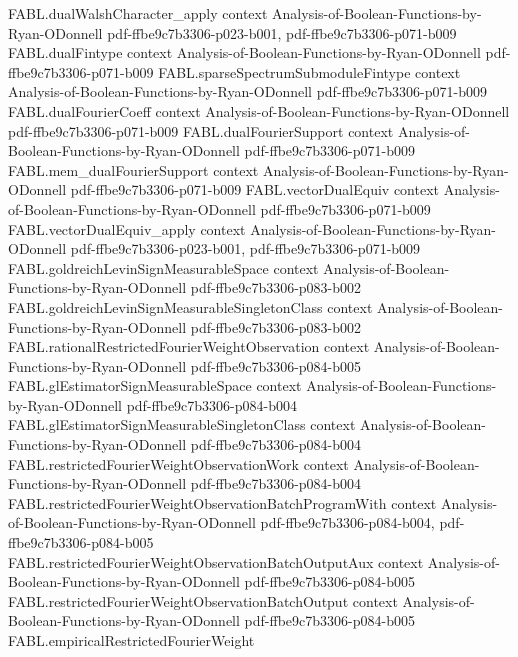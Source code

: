 \begin{theorem}
\proofstep
  {FABL.dualWalshCharacter_apply}
  {context}
  {Analysis-of-Boolean-Functions-by-Ryan-ODonnell}
  {pdf-ffbe9c7b3306-p023-b001,
    pdf-ffbe9c7b3306-p071-b009}
\proofstep
  {FABL.dualFintype}
  {context}
  {Analysis-of-Boolean-Functions-by-Ryan-ODonnell}
  {pdf-ffbe9c7b3306-p071-b009}
\proofstep
  {FABL.sparseSpectrumSubmoduleFintype}
  {context}
  {Analysis-of-Boolean-Functions-by-Ryan-ODonnell}
  {pdf-ffbe9c7b3306-p071-b009}
\proofstep
  {FABL.dualFourierCoeff}
  {context}
  {Analysis-of-Boolean-Functions-by-Ryan-ODonnell}
  {pdf-ffbe9c7b3306-p071-b009}
\proofstep
  {FABL.dualFourierSupport}
  {context}
  {Analysis-of-Boolean-Functions-by-Ryan-ODonnell}
  {pdf-ffbe9c7b3306-p071-b009}
\proofstep
  {FABL.mem_dualFourierSupport}
  {context}
  {Analysis-of-Boolean-Functions-by-Ryan-ODonnell}
  {pdf-ffbe9c7b3306-p071-b009}
\proofstep
  {FABL.vectorDualEquiv}
  {context}
  {Analysis-of-Boolean-Functions-by-Ryan-ODonnell}
  {pdf-ffbe9c7b3306-p071-b009}
\proofstep
  {FABL.vectorDualEquiv_apply}
  {context}
  {Analysis-of-Boolean-Functions-by-Ryan-ODonnell}
  {pdf-ffbe9c7b3306-p023-b001,
    pdf-ffbe9c7b3306-p071-b009}
\proofstep
  {FABL.goldreichLevinSignMeasurableSpace}
  {context}
  {Analysis-of-Boolean-Functions-by-Ryan-ODonnell}
  {pdf-ffbe9c7b3306-p083-b002}
\proofstep
  {FABL.goldreichLevinSignMeasurableSingletonClass}
  {context}
  {Analysis-of-Boolean-Functions-by-Ryan-ODonnell}
  {pdf-ffbe9c7b3306-p083-b002}
\proofstep
  {FABL.rationalRestrictedFourierWeightObservation}
  {context}
  {Analysis-of-Boolean-Functions-by-Ryan-ODonnell}
  {pdf-ffbe9c7b3306-p084-b005}
\proofstep
  {FABL.glEstimatorSignMeasurableSpace}
  {context}
  {Analysis-of-Boolean-Functions-by-Ryan-ODonnell}
  {pdf-ffbe9c7b3306-p084-b004}
\proofstep
  {FABL.glEstimatorSignMeasurableSingletonClass}
  {context}
  {Analysis-of-Boolean-Functions-by-Ryan-ODonnell}
  {pdf-ffbe9c7b3306-p084-b004}
\proofstep
  {FABL.restrictedFourierWeightObservationWork}
  {context}
  {Analysis-of-Boolean-Functions-by-Ryan-ODonnell}
  {pdf-ffbe9c7b3306-p084-b004}
\proofstep
  {FABL.restrictedFourierWeightObservationBatchProgramWith}
  {context}
  {Analysis-of-Boolean-Functions-by-Ryan-ODonnell}
  {pdf-ffbe9c7b3306-p084-b004,
    pdf-ffbe9c7b3306-p084-b005}
\proofstep
  {FABL.restrictedFourierWeightObservationBatchOutputAux}
  {context}
  {Analysis-of-Boolean-Functions-by-Ryan-ODonnell}
  {pdf-ffbe9c7b3306-p084-b005}
\proofstep
  {FABL.restrictedFourierWeightObservationBatchOutput}
  {context}
  {Analysis-of-Boolean-Functions-by-Ryan-ODonnell}
  {pdf-ffbe9c7b3306-p084-b005}
\proofstep
  {FABL.empiricalRestrictedFourierWeight}

\end{theorem}
